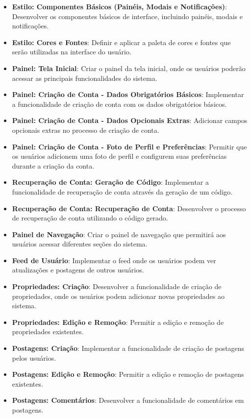 \documentclass[../main.tex]{subfiles}
\begin{document}
\begin{itemize}
    \item \textbf{Estilo: Componentes Básicos (Painéis, Modais e Notificações)}: Desenvolver os componentes básicos de interface, incluindo painéis, modais e notificações.
    \item \textbf{Estilo: Cores e Fontes}: Definir e aplicar a paleta de cores e fontes que serão utilizadas na interface do usuário.
    \item \textbf{Painel: Tela Inicial}: Criar o painel da tela inicial, onde os usuários poderão acessar as principais funcionalidades do sistema.
    \item \textbf{Painel: Criação de Conta - Dados Obrigatórios Básicos}: Implementar a funcionalidade de criação de conta com os dados obrigatórios básicos.
    \item \textbf{Painel: Criação de Conta - Dados Opcionais Extras}: Adicionar campos opcionais extras no processo de criação de conta.
    \item \textbf{Painel: Criação de Conta - Foto de Perfil e Preferências}: Permitir que os usuários adicionem uma foto de perfil e configurem suas preferências durante a criação da conta.
    \item \textbf{Recuperação de Conta: Geração de Código}: Implementar a funcionalidade de recuperação de conta através da geração de um código.
    \item \textbf{Recuperação de Conta: Recuperação de Conta}: Desenvolver o processo de recuperação de conta utilizando o código gerado.
    \item \textbf{Painel de Navegação}: Criar o painel de navegação que permitirá aos usuários acessar diferentes seções do sistema.
    \item \textbf{Feed de Usuário}: Implementar o feed onde os usuários podem ver atualizações e postagens de outros usuários.
    \item \textbf{Propriedades: Criação}: Desenvolver a funcionalidade de criação de propriedades, onde os usuários podem adicionar novas propriedades ao sistema.
    \item \textbf{Propriedades: Edição e Remoção}: Permitir a edição e remoção de propriedades existentes.
    \item \textbf{Postagens: Criação}: Implementar a funcionalidade de criação de postagens pelos usuários.
    \item \textbf{Postagens: Edição e Remoção}: Permitir a edição e remoção de postagens existentes.
    \item \textbf{Postagens: Comentários}: Desenvolver a funcionalidade de comentários em postagens.

\end{itemize}
\end{document}
